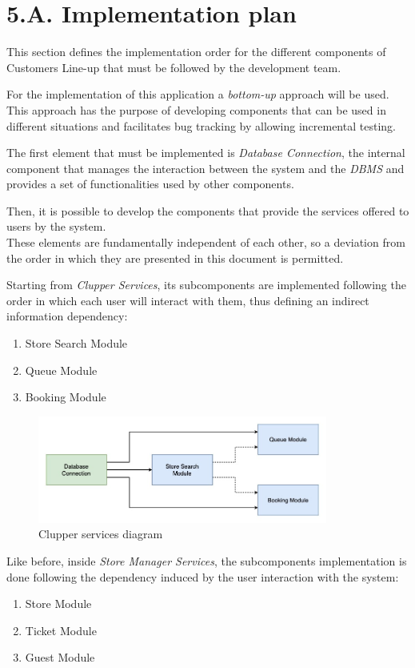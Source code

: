 \section{5.A. Implementation plan}

This section defines the implementation order for the different components of Customers Line-up that must be followed by the development team.

For the implementation of this application a \emph{bottom-up} approach will be used. This approach has the purpose of developing components that can be used in different situations and facilitates bug tracking by allowing incremental testing.

The first element that must be implemented is \emph{Database Connection}, the internal component that manages the interaction between the system and the \emph{DBMS} and provides a set of functionalities used by other components.

Then, it is possible to develop the components that provide the services offered to users by the system.\\
These elements are fundamentally independent of each other, so a deviation from the order in which they are presented in this document is permitted.

Starting from \emph{Clupper Services}, its subcomponents are implemented following the order in which each user will interact with them, thus defining an indirect information dependency:
\begin{enumerate}
    \item Store Search Module
    \item Queue Module
    \item Booking Module
\end{enumerate}

\begin{figure}[H]
\centering
\includegraphics[width=0.85\textwidth]{implementation_diagrams/clupper_services_diagram}
\caption{Clupper services diagram}
\end{figure}

Like before, inside \emph{Store Manager Services}, the subcomponents implementation is done following the dependency induced by the user interaction with the system:
\begin{enumerate}
    \item Store Module
    \item Ticket Module
    \item Guest Module
\end{enumerate}

